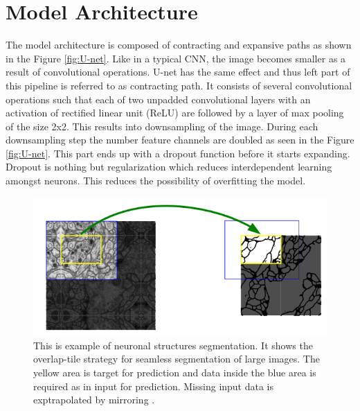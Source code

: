 \documentclass[11pt]{article}
\begin{document}


\section{Model Architecture}
The model architecture is composed of contracting and expansive paths as shown in the Figure \ref{fig:U-net}. Like in a typical CNN, the image becomes smaller as a result of convolutional operations. U-net has the same effect and thus left part of this pipeline is referred to as contracting path. It consists of several convolutional operations such that each of two unpadded convolutional layers with an activation of rectified linear unit (ReLU) are followed by a layer of max pooling of the size 2x2. This results into downsampling of the image. During each downsampling step the number feature channels are doubled as seen in the Figure \ref{fig:U-net}. This part ends up with a dropout function before it starts expanding. Dropout is nothing but regularization which reduces interdependent learning amongst neurons. This reduces the possibility of overfitting the model.

\begin{figure}[H]
	\centering
	\includegraphics[width=.6\linewidth]{files/unet/tile.png}
	\caption{This is example of neuronal structures segmentation. It shows the overlap-tile strategy for seamless segmentation of large images. The yellow area is target for prediction and data inside the blue area is required as in input for prediction. Missing input data is exptrapolated by mirroring \cite{ronneberger2015u}.}
	\label{fig:tiling}
\end{figure} 
\end{document}
